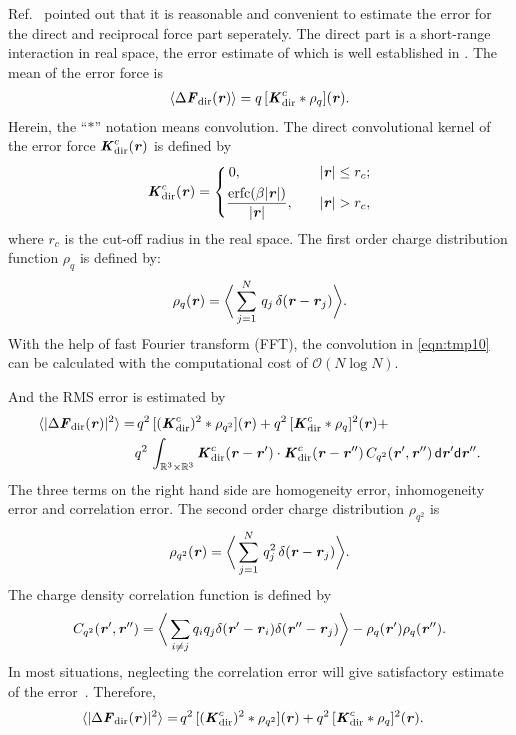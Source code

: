 \documentclass[aps,pre,preprint]{revtex4-1}
\renewcommand{\v}[1]{\textbf{\textit{#1}}}
\renewcommand{\d}[1]{\textsf{#1}}
\begin{document}
Ref.~\cite{wang2010optimizing} pointed out that it
is reasonable and convenient to estimate the error for the direct and
reciprocal force part seperately. 
The direct part is a short-range
interaction in real space, the error estimate of which
is well established in \cite{short}.
The mean of the error force is
\begin{align}\label{eqn:tmp10}
  \langle\Delta\v F_{\textrm{dir}}(\v r)\rangle
  =q\, [\v K^c_{\textrm{dir}}\ast\rho_q](\v r).
\end{align}
Herein, the ``$\ast$'' notation means convolution.  The direct
convolutional kernel of the error force $\v K^c_{\textrm{dir}}(\v r)$
is defined by
\begin{align}
  \v K^c_{\textrm{dir}}(\v r) =
  \left\{
    \begin{aligned}
      &\,0, &\quad & \vert\v r\vert \leq r_c;\\
      &\frac{\textrm{erfc}(\beta\vert\v r\vert)}{\vert\v r\vert},& & \vert\v r\vert > r_c,
    \end{aligned}
  \right.
\end{align}
where $r_c$ is the cut-off radius in the real space.  The first order
charge distribution function $\rho_q$ is defined by:
\begin{align}
  \rho_q(\v r) = 
  \bigg\langle
  \sum_{j = 1}^N
  \,q_j\,\delta(\v r - \v r_j)
  \bigg\rangle.
\end{align}
With the help of fast Fourier transform (FFT), the convolution in
\eqref{eqn:tmp10} can be calculated with the computational cost of
$\mathcal O(N\log N)$.

And the RMS error is estimated by
\begin{align}\nonumber
  \langle\vert\Delta\v F_{\textrm{dir}}(\v r)\vert^2\rangle
  = &\,
  q^2\,[(\v K^c_{\textrm{dir}})^2\ast\rho_{q^2}] (\v r) + 
  q^2\,[\v K^c_{\textrm{dir}}\ast\rho_{q}]^2 (\v r) + \\
  &
  q^2\,\int_{\mathbb R^3\times\mathbb R^3}
  \v K^c_{\textrm{dir}}(\v r-\v r')\cdot
  \v K^c_{\textrm{dir}}(\v r-\v r'')\,
  C_{q^2}(\v r', \v r'')\,
  \d d\v r'\d d\v r''.
\end{align}
The three terms on the right hand side are homogeneity error,
inhomogeneity error and correlation error. The second order charge
distribution $\rho_{q^2}$ is
\begin{align}
  \rho_{q^2}(\v r) = 
  \bigg\langle
  \sum_{j = 1}^N
  \,q^2_j\,\delta(\v r - \v r_j)
  \bigg\rangle.
\end{align}
The charge density correlation function is defined by
\begin{align}
  C_{q^2}(\v r', \v r'')
  =
  \bigg\langle
  \sum_{i\neq j}q_iq_j\delta(\v r'-\v r_i)\delta(\v r''-\v r_j)
  \bigg\rangle
  - \rho_q(\v r')\rho_q(\v r'').
\end{align}
In most situations, neglecting the correlation error will give
satisfactory estimate of the error~\cite{short}. Therefore, 
\begin{align}
  \langle\vert\Delta\v F_{\textrm{dir}}(\v r)\vert^2\rangle
  = &\,
  q^2\,[(\v K^c_{\textrm{dir}})^2\ast\rho_{q^2}] (\v r) + 
  q^2\,[\v K^c_{\textrm{dir}}\ast\rho_{q}]^2 (\v r).
\end{align}
\end{document}
